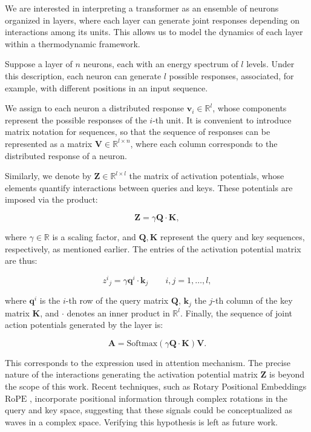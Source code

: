 \documentclass[12pt]{article}
\begin{document}
We are interested in interpreting a transformer as an ensemble of neurons organized in layers, where each layer can generate joint responses depending on interactions among its units. This allows us to model the dynamics of each layer within a thermodynamic framework.

Suppose a layer of $n$ neurons, each with an energy spectrum of $l$ levels. Under this description, each neuron can generate $l$ possible responses, associated, for example, with different positions in an input sequence.

We assign to each neuron a distributed response $\mathbf{v}_i \in \mathbb{R}^l$, whose components represent the possible responses of the $i$-th unit. It is convenient to introduce matrix notation for sequences, so that the sequence of responses can be represented as a matrix $\mathbf{V} \in \mathbb{R}^{l \times n}$, where each column corresponds to the distributed response of a neuron.

Similarly, we denote by $\mathbf{Z} \in \mathbb{R}^{l \times l}$ the matrix of activation potentials, whose elements quantify interactions between queries and keys. These potentials are imposed via the product:

\begin{equation}
\mathbf{Z} = \gamma \mathbf{Q} \cdot \mathbf{K},
\end{equation}

where $\gamma \in \mathbb{R}$ is a scaling factor, and $\mathbf{Q}, \mathbf{K}$ represent the query and key sequences, respectively, as mentioned earlier. The entries of the activation potential matrix are thus:

\begin{equation}
z^i{}_j = \gamma \mathbf{q}^i \cdot \mathbf{k}_j \qquad i,j = 1,\dots,l,
\end{equation}

where $\mathbf{q}^i$ is the $i$-th row of the query matrix $\mathbf{Q}$, $\mathbf{k}_j$ the $j$-th column of the key matrix $\mathbf{K}$, and $\cdot$ denotes an inner product in $\mathbb{R}^l$. Finally, the sequence of joint action potentials generated by the layer is:

\begin{equation}
\mathbf{A} = \text{Softmax}(\gamma \mathbf{Q} \cdot \mathbf{K}) \mathbf{V}.
\end{equation}

This corresponds to the expression used in attention mechanism. The precise nature of the interactions generating the activation potential matrix $\mathbf{Z}$ is beyond the scope of this work. Recent techniques, such as Rotary Positional Embeddings $\text{RoPE}$ \cite{su2021roformer}, incorporate positional information through complex rotations in the query and key space, suggesting that these signals could be conceptualized as waves in a complex space. Verifying this hypothesis is left as future work.
\end{document}
